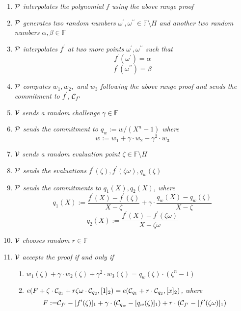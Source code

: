 \begin{enumerate}
    \item $\mathcal{P}$ \textit{interpolates the polynomial $f$ using the above range proof}
    \item $\mathcal{P}$ \textit{generates two random numbers $\omega^{\prime},\omega^{\prime\prime}\in\mathbb{F}\setminus{H}$ and another two random numbers $\alpha,\beta\in\mathbb{F}$}
    \item $\mathcal{P}$ \textit{interpolates $f^\prime$ at two more points ${\omega^{\prime},\omega^{\prime\prime}}$ such that}
    \[ f^\prime(\omega^{\prime})=\alpha \]
    \[ f^\prime(\omega^{\prime\prime})=\beta \]
    \item $\mathcal{P}$ \textit{computes $w_1,w_2,$ and $w_3$ following the above range proof and sends the commitment to $f^\prime$,} $\mathcal{C}_{f^\prime}$
    \item $\mathcal{V}$ \textit{sends a random challenge $\gamma\in\mathbb{F}$}
    \item $\mathcal{P}$ \textit{sends the commitment to $q_w:=w/(X^n-1)$ where}
    \[ w:=w_1+\gamma\cdot{w_2}+\gamma^2\cdot{w_3} \]
    \item $\mathcal{V}$ \textit{sends a random evaluation point $\zeta\in\mathbb{F}\setminus{H}$}
    \item $\mathcal{P}$ \textit{sends the evaluations $f^\prime(\zeta),f^\prime(\zeta\omega),q_w(\zeta)$}
    \item $\mathcal{P}$ \textit{sends the commitments to $q_1(X),q_2(X)$, where}
    \[ q_1(X):=\frac{f^\prime(X)-f^\prime(\zeta)}{X-\zeta}+\gamma\cdot\frac{q_w(X)-q_w(\zeta)}{X-\zeta} \]
    \[ q_2(X):=\frac{f^\prime(X)-f^\prime(\zeta\omega)}{X-\zeta\omega} \]
    \item $\mathcal{V}$ \textit{chooses random $r\in\mathbb{F}$}
    \item $\mathcal{V}$ \textit{accepts the proof if and only if}
    \begin{enumerate}
    	\item $w_1(\zeta)+\gamma\cdot{w_2(\zeta)}+\gamma^2\cdot{w_3(\zeta)}=q_w(\zeta)\cdot(\zeta^n-1)$
    	\item $e(F+\zeta\cdot\mathcal{C}_{q_1}+r\zeta\omega\cdot\mathcal{C}_{q_2},[1]_2)=e(\mathcal{C}_{q_1}+r\cdot\mathcal{C}_{q_2},[x]_2)$\textit{, where}
    	\begin{align*}
    		F:=&\mathcal{C}_{f^\prime}-[f^\prime(\zeta)]_1+\gamma\cdot(\mathcal{C}_{q_w}-[q_w(\zeta)]_1)+r\cdot(\mathcal{C}_{f^\prime}-[f^\prime(\zeta\omega)]_1)
    	\end{align*}
    \end{enumerate}
\end{enumerate}

